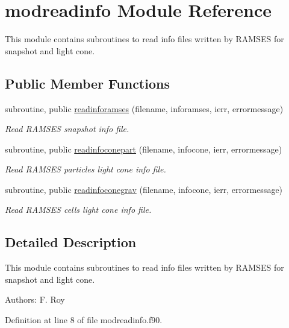 \hypertarget{classmodreadinfo}{\section{modreadinfo Module Reference}
\label{classmodreadinfo}
}


This module contains subroutines to read info files written by R\-A\-M\-S\-E\-S for snapshot and light cone.  


\subsection*{Public Member Functions}
\begin{DoxyCompactItemize}
\item 
subroutine, public \hyperlink{classmodreadinfo_a6b1960d0fb1f7800a425f5b1faea27de}{readinforamses} (filename, inforamses, ierr, errormessage)
\begin{DoxyCompactList}\small\item\em Read R\-A\-M\-S\-E\-S snapshot info file. \end{DoxyCompactList}\item 
subroutine, public \hyperlink{classmodreadinfo_a436889f23a31abe9a2794adf382ed2ff}{readinfoconepart} (filename, infocone, ierr, errormessage)
\begin{DoxyCompactList}\small\item\em Read R\-A\-M\-S\-E\-S particles light cone info file. \end{DoxyCompactList}\item 
subroutine, public \hyperlink{classmodreadinfo_a101c52b11351822adad865d03b999f4e}{readinfoconegrav} (filename, infocone, ierr, errormessage)
\begin{DoxyCompactList}\small\item\em Read R\-A\-M\-S\-E\-S cells light cone info file. \end{DoxyCompactList}\end{DoxyCompactItemize}


\subsection{Detailed Description}
This module contains subroutines to read info files written by R\-A\-M\-S\-E\-S for snapshot and light cone. 

Authors\-: F. Roy 

Definition at line 8 of file modreadinfo.\-f90.



